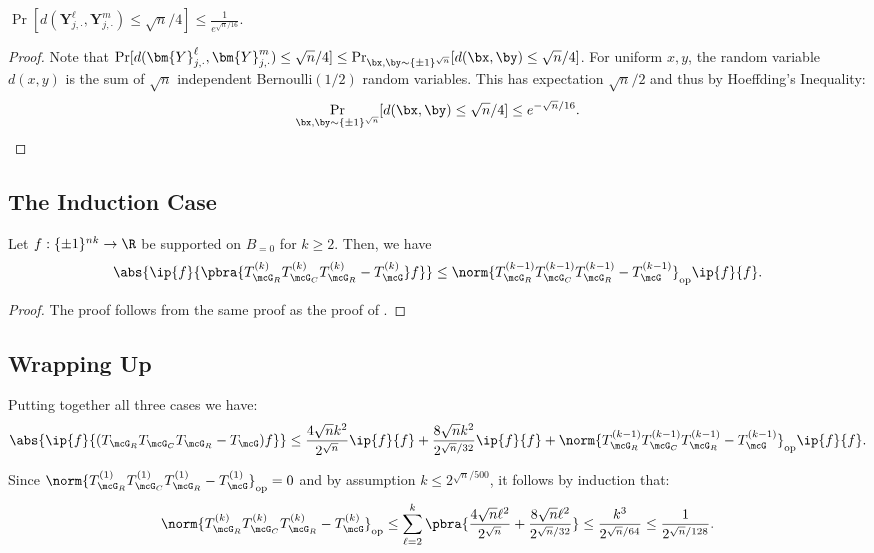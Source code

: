 \begin{lemma}\label{lem:Y probably far 2D}
    $\Pr[d(\bm{Y}^\ell_{j, \cdot}, \bm{Y}^m_{j, \cdot}) \leq \sqrt{n}/4] \leq \frac{1}{e^{\sqrt{n}/16}}$.
\end{lemma}
\begin{proof}
Note that $\Pr[d(\bm{Y}^\ell_{j, \cdot},\bm{Y}^m_{j, \cdot}) \leq \sqrt{n}/4] \leq \Pr_{\bx, \by \sim \{\pm1\}^{\sqrt{n}}}[d(\bx, \by) \leq \sqrt{n}/4]$. For uniform $x,y$, the random variable $d(x,y)$ is the sum of $\sqrt{n}$ independent Bernoulli$(1/2)$ random variables. This has expectation $\sqrt{n}/2$ and thus by Hoeffding's Inequality:
\begin{equation*}
    \Pr_{\bx,\by \sim \{\pm1\}^{\sqrt{n}}}[d(\bx,\by) \leq \sqrt{n}/4] \leq e^{-\sqrt{n}/16}.\qedhere
\end{equation*}
\end{proof}

\subsection{The Induction Case}

\begin{lemma} \label{lemmaInductionCase}
Let $f : \{\pm1\}^{nk} \to \R$ be supported on $B_{=0}$ for $k \geq 2$. Then, we have
\[ 
\abs{\ip{f}{\pbra{T_{\mcG_R}^{(k)}T_{\mcG_C}^{(k)}T_{\mcG_R}^{(k)} - T_\mcG^{(k)}}f}} \le \norm{T_{\mcG_R}^{(k-1)}T_{\mcG_C}^{(k-1)}T_{\mcG_R}^{(k-1)} - T_{\mcG}^{(k-1)}}_{\mathrm{op}} \ip{f}{f}. 
\]
\end{lemma}

\begin{proof}
    The proof follows from the same proof as the proof of .
\end{proof}

\subsection{Wrapping Up}

Putting together all three cases we have:
\begin{equation*}
    \abs{\ip{f}{(T_{\mcG_R}T_{\mcG_C}T_{\mcG_R} - T_\mcG) f}} \leq \frac{4\sqrt{n}k^2}{2^{\sqrt{n}}}\ip{f}{f} + \frac{8\sqrt{n}k^2}{2^{\sqrt{n}/32}} \ip{f}{f} + \norm{T_{\mcG_R}^{(k-1)}T_{\mcG_C}^{(k-1)}T_{\mcG_R}^{(k-1)} - T_\mcG^{(k-1)}}_{\mathrm{op}}\ip{f}{f}.
\end{equation*}

Since $\norm{T_{\mcG_R}^{(1)}T_{\mcG_C}^{(1)}T_{\mcG_R}^{(1)} - T_\mcG^{(1)}}_{\mathrm{op}} = 0$ and by assumption $k \leq 2^{\sqrt{n}/500}$, it follows by induction that:
\[ \norm{T_{\mcG_R}^{(k)}T_{\mcG_C}^{(k)}T_{\mcG_R}^{(k)} - T_\mcG^{(k)}}_{\mathrm{op}} \le \sum_{\ell = 2}^k \pbra{\frac{4\sqrt{n}\ell^2}{2^{\sqrt{n}}} + \frac{8\sqrt{n}\ell^2}{2^{\sqrt{n}/32}}} \leq \frac{k^3}{2^{\sqrt{n}/64}} \leq \frac{1}{2^{\sqrt{n}/128}}. \]


